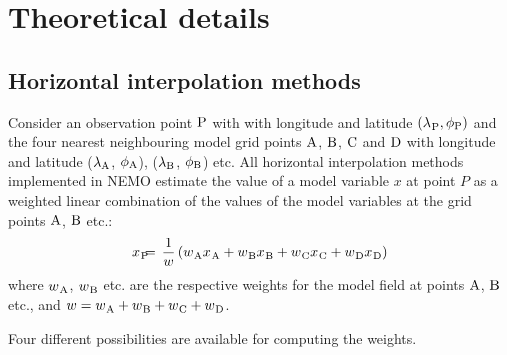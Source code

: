 \section{Theoretical details}
\label{OBS_theory}

\subsection{Horizontal interpolation methods}

Consider an observation point ${\rm P}$ with 
with longitude and latitude $({\lambda_{}}_{\rm P}, \phi_{\rm P})$ and the 
four nearest neighbouring model grid points ${\rm A}$, ${\rm B}$, ${\rm C}$ 
and ${\rm D}$ with longitude and latitude ($\lambda_{\rm A}$, $\phi_{\rm A}$),
($\lambda_{\rm B}$, $\phi_{\rm B}$) etc.
All horizontal interpolation methods implemented in NEMO
estimate the value of a model variable $x$ at point $P$ as
a weighted linear combination of the values of the model 
variables at the grid points ${\rm A}$, ${\rm B}$ etc.:
\begin{eqnarray}
{x_{}}_{\rm P} & \hspace{-2mm} = \hspace{-2mm} & 
\frac{1}{w} \left( {w_{}}_{\rm A} {x_{}}_{\rm A} + 
                   {w_{}}_{\rm B} {x_{}}_{\rm B} + 
                   {w_{}}_{\rm C} {x_{}}_{\rm C} + 
                   {w_{}}_{\rm D} {x_{}}_{\rm D} \right)
\end{eqnarray}
where ${w_{}}_{\rm A}$, ${w_{}}_{\rm B}$ etc. are the respective weights for the 
model field at points ${\rm A}$, ${\rm B}$ etc., and 
$w = {w_{}}_{\rm A} + {w_{}}_{\rm B} + {w_{}}_{\rm C} + {w_{}}_{\rm D}$.

Four different possibilities are available for computing the weights.

